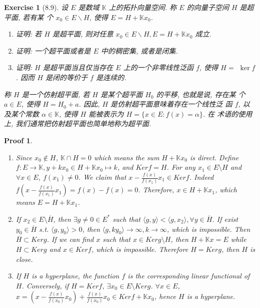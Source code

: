 \documentclass[hyperref,UTF8]{ctexart}
\newtheorem{ex}{Exercise}[section]
\newtheorem{pf}{Proof}[section]
\begin{document}
\begin{ex}[8.9]
    设 $E$ 是数域 $\mathbb{K}$ 上的拓扑向量空间. 称 $E$ 的向量子空间 $H$ 是超平面, 若有某 个 $x_{0} \in E \backslash H$, 使得 $E=H+\mathbb{K} x_{0}$.
    \begin{enumerate}
        \item 证明: 若 $H$ 是超平面, 则对任意 $x_{0} \in E \backslash H, E=H+\mathbb{K} x_{0}$ 成立.
        \item 证明: 一个超平面或者是 $E$ 中的稠密集, 或者是闭集.
        \item 证明: $H$ 是超平面当且仅当存在 $E$ 上的一个非零线性泛函 $f$, 使得 $H=$ $\operatorname{ker} f$. 因而 $H$ 是闭的等价于 $f$ 是连续的.
    \end{enumerate}
称 $H$ 是一个仿射超平面, 若 $H$ 是某个超平面 $H_{0}$ 的平移, 也就是说, 存在某 个 $a \in E$, 使得 $H=H_{0}+a$. 因此, $H$ 是仿射超平面意味着存在一个线性泛 函 $f$, 以及某个常数 $\alpha \in \mathbb{K}$, 使得 $H$ 能被表示为 $H=\{x \in E: f(x)=\alpha\}$. 在 术语的使用上, 我们通常把仿射超平面也简单地称为超平面.
\end{ex}
\begin{pf}
\begin{enumerate}
    \item Since $x_0\notin H$, $\mathbb K \cap H = 0$ which means the sum $H + \mathbb K x_0$ is direct. Define $f:E\to \mathbb K, y + k x_0\in H+\mathbb K x_0\mapsto k$, and $Ker f = H$. For any $x_1\in E\setminus H$ and $\forall x\in E$, $f(x_1)\neq 0$. We claim that $x - \frac{f(x)}{f(x_1)}x_1\in Ker f$. Indeed $f(x - \frac{f(x)}{f(x_1)}x_1) = f(x) - f(x) = 0$. Therefore, $x \in H + \mathbb K x_1$, which means $E = H + \mathbb K x_1$. 
    \item If $x_2\in E\setminus \overline H$, then $\exists g\neq 0 \in E^*$ such that $\langle g, y\rangle < \langle g, x_2\rangle, \forall y \in \overline H$. If exist $y_0\in \overline H$ s.t. $\langle g, y_0 \rangle > 0$, then $\langle g, k y_0\rangle\to \infty, k\to\infty$, which is impossible. Then $\overline H \subset Ker g$. If we can find $x$ such that $ x\in Ker g\setminus H$, then $H + \mathbb K x = E$ while $H\subset Ker g$ and $x\in Ker f$, which is impossible. Therefore $H = Ker g$, then $H$ is close. 
    \item If $H$ is a hyperplane, the function $f$ is the corresponding linear functional of $H$. Conversely, if $H = Ker f$, $\exists x_0\in E\setminus Ker g$. $\forall x \in E$, $x = (x - \frac{f(x)}{f(x_0)}x_0) + \frac{f(x)}{f(x_0)}x_0\in Ker f + \mathbb K x_0$, hence $H$ is a hyperplane. 
\end{enumerate}

\end{pf}
\end{document}
